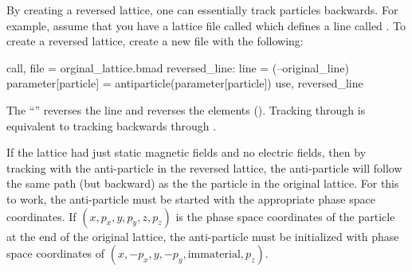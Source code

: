 By creating a reversed lattice, one can essentially track particles backwards. For example,
assume that you have a lattice file called  which defines a line
called . To create a reversed lattice, create a new file with the following:
\begin{example}
  call, file = orginal_lattice.bmad
  reversed_line: line = (--original_line)
  parameter[particle] = antiparticle(parameter[particle])
  use, reversed_line
\end{example}
The ``\vn{--}'' reverses the line and reverses the elements (). Tracking through
 is equivalent to tracking backwards through .  

If the  lattice had just static magnetic fields and no electric fields, then
by tracking with the anti-particle in the reversed lattice, the anti-particle will follow the same
path (but backward) as the the particle in the original lattice. For this to work, the anti-particle
must be started with the appropriate phase space coordinates. If $(x, p_x, y, p_y, z, p_z)$ is
the phase space coordinates of the particle at the end of the original lattice, the anti-particle
must be initialized with phase space coordinates of $(x, -p_x, y, -p_y, \text{immaterial}, p_z)$.
